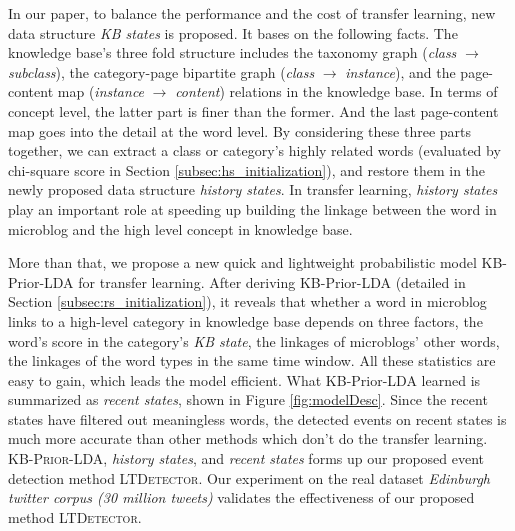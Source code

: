 \documentclass[runningheads,a4paper]{llncs}
\begin{document}
In our paper, to balance the performance and the cost of transfer learning, new data structure \textit{KB states} is proposed. 
It bases on the following facts. 
The knowledge base's three fold structure includes the taxonomy graph (\textit{class} \(\rightarrow\) \textit{subclass}), the category-page bipartite graph (\textit{class} \(\rightarrow\) \textit{instance}), and the page-content map (\textit{instance} \(\rightarrow\) \textit{content}) relations in the knowledge base. 
In terms of concept level, the latter part is finer than the former. 
And the last page-content map goes into the detail at the word level. 
By considering these three parts together, we can extract a class or category's highly related words (evaluated by chi-square score in Section \ref{subsec:hs_initialization}), and restore them in the newly proposed data structure \textit{history states}.
In transfer learning, \textit{history states} play an important role at speeding up building the linkage between the word in microblog and the high level concept in knowledge base. 

More than that, we propose a new quick and lightweight probabilistic model KB-Prior-LDA for transfer learning. 
After deriving KB-Prior-LDA (detailed in Section \ref{subsec:rs_initialization}), it reveals that whether a word in microblog links to a high-level category in knowledge base depends on three factors, the word's score in the category's \textit{KB state}, the linkages of microblogs' other words, the linkages of the word types in the same time window. 
All these statistics are easy to gain, which leads the model efficient. 
What KB-Prior-LDA learned is summarized as \textit{recent states}, shown in Figure \ref{fig:modelDesc}.
Since the recent states have filtered out meaningless words, the detected events on recent states is much more accurate than other methods which don't do the transfer learning.
\textsc{KB-Prior-LDA}, \textit{history states}, and \textit{recent states} forms up our proposed event detection method \textsc{LTDetector}.
Our experiment on the real dataset \textit{Edinburgh twitter corpus (30 million tweets)} validates the effectiveness of our proposed method \textsc{LTDetector}.
\end{document}
